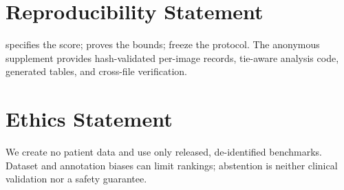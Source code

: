 \section*{Reproducibility Statement}

 specifies the score;
 proves the bounds; 
freeze the protocol. The anonymous supplement
provides hash-validated per-image records, tie-aware analysis code, generated
tables, and cross-file verification.

\section*{Ethics Statement}

We create no patient data and use only released, de-identified benchmarks.
Dataset and annotation biases can limit rankings; abstention is neither clinical
validation nor a safety guarantee.
